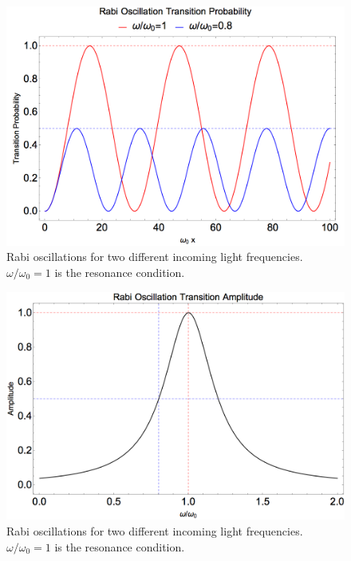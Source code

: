 \begin{figure}
    \centering
    \includegraphics[width=\textwidth]{chapters/assets/app/rabi-oscillations.png}
    \caption{Rabi oscillations for two different incoming light frequencies. $\omega/\omega_0=1$ is the resonance condition.}
    \label{app-fig:rabi-examples}
\end{figure}



\begin{figure}
    \centering
    \includegraphics{chapters/assets/app/rabi-resonance.png}
    \caption{Rabi oscillations for two different incoming light frequencies. $\omega/\omega_0=1$ is the resonance condition.}
    \label{app-fig:rabi-resonance-width}
\end{figure}




